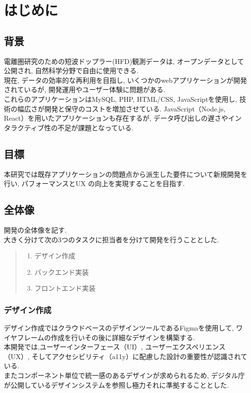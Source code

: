 \section{はじめに}
\subsection{背景}
電離圏研究のための短波ドップラー(HFD)観測データは, オープンデータとして公開され, 自然科学分野で自由に使用できる. \\
現在, データの効率的な再利用を目指し, いくつかのwebアプリケーションが開発されているが, 開発運用やユーザー体験に問題がある. \\
これらのアプリケーションはMySQL, PHP, HTML/CSS, JavaScriptを使用し, 技術の幅広さが開発と保守のコストを増加させている. 
JavaScript（Node.js, React）を用いたアプリケーションも存在するが, データ呼び出しの遅さやインタラクティブ性の不足が課題となっている. \cite{no1}

\subsection{目標}
本研究では既存アプリケーションの問題点から派生した要件について新規開発を行い,  パフォーマンスとUX の向上を実現することを目指す.

\subsection{全体像}
開発の全体像を記す.\\
大きく分けて次の3つのタスクに担当者を分けて開発を行うこととした.
\begin{quote}
	\begin{enumerate}
		\item デザイン作成
		\item バックエンド実装
		\item フロントエンド実装
	\end{enumerate}
\end{quote}

\subsubsection{デザイン作成}
デザイン作成ではクラウドベースのデザインツールであるFigmaを使用して, ワイヤフレームの作成を行いその後に詳細なデザインを構築する. \\
本開発では,ユーザーインターフェース（UI）, ユーザーエクスペリエンス（UX）, そしてアクセシビリティ（a11y）に配慮した設計の重要性が認識されている. \cite{no2} \\
またコンポーネント単位で統一感のあるデザインが求められるため, デジタル庁が公開しているデザインシステムを参照し極力それに準拠することとした.\cite{no3}\cite{no4}

